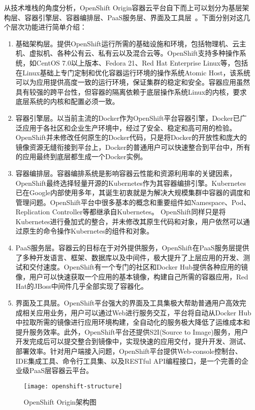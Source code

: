 从技术堆栈的角度分析，OpenShift Origin容器云平台自下而上可以划分为基层架构层、容器引擎层、容器编排层、PaaS服务层、界面及工具层~\cite{2017Kubernetes}。下面分别对这几个层次功能进行简单介绍：
\begin{enumerate}[1.]
	\item 基础架构层。提供OpenShift运行所需的基础设施和环境，包括物理机、云主机、虚拟机、各种公有云、私有云以及混合云等。OpenShift支持多种操作系统，如CentOS 7.0以上版本、Fedora 21、Red Hat Enterprise Linux等，包括在Linux基础上专门定制和优化容器运行环境的操作系统Atomic Host，该系统可以为应用提供高度一致的运行环境，保证集群的稳定和安全。容器应用虽然具有较强的跨平台性，但容器的隔离依赖于底层操作系统Linux的内核，要求底层系统的内核和配置必须一致。
	\item 容器引擎层。以当前主流的Docker作为OpenShift平台容器引擎，Docker已广泛应用于各社区和企业生产环境中，经过了安全、稳定和高可用的检验。OpenShift并未修改任何原生的Docker代码，只是将Docker的开放性和庞大的镜像资源无缝衔接到平台上，Docker的普通用户可以快速整合到平台中，所有的应用最终到底层都生成一个Docker实例。
	\item 容器编排层。容器编排系统是影响容器云性能和资源利用率的关键因素，OpenShift最终选择轻量开源的Kubernetes作为其容器编排引擎。Kubernetes已在Google内部使用多年，其诞生初衷就是为解决大规模集群中容器的调度和管理问题。OpenShift平台中很多基本的概念和重要组件如Namespace、Pod、Replication Controller等都继承自Kubernetes。
	OpenShift同样只是将Kubernetes进行叠加式的整合，并未修改其原生代码和对象，用户依然可以通过原生的命令操作Kubernetes的组件和对象。
	\item PaaS服务层。容器云的目标在于对外提供服务，OpenShift在PaaS服务层提供了多种开发语言、框架、数据库以及中间件，极大提升了上层应用的开发、测试和交付速度。OpenShift有一个专门的社区和Docker Hub提供各种应用的镜像，用户可以快速获取一个应用的基本镜像，构建自己所需的容器应用，Red Hat的JBoss中间件几乎全部实现了容器化。
	\item 界面及工具层。OpenShift平台强大的界面及工具集极大帮助普通用户高效完成相关应用业务，用户可以通过Web进行服务交互，平台将自动从Docker Hub中拉取所需的镜像进行应用环境构建，全自动化的服务极大降低了运维成本和提升服务效率。此外，OpenShift平台还提供S2I(Source to Image)服务，用户开发完成后可以提交整合到镜像中，实现快速的应用交付，提升开发、测试、部署效率。针对用户端接入问题，OpenShift平台提供Web-console控制台、IDE集成工具、命令行工具集、以及RESTful API编程接口，是一个完善的企业级PaaS层容器云平台。
\end{enumerate}
\begin{figure}[H] %
	\centering
	\texttt{[image: openshift-structure]}
	\caption{OpenShift Origin架构图~\cite{Lossent2017PaaS}}
\end{figure}

